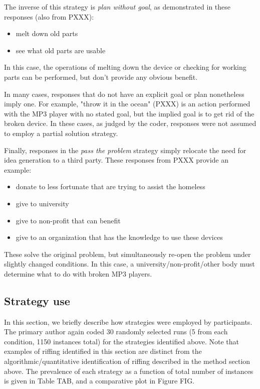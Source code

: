 The inverse of this strategy is \emph{plan without goal}, as demonstrated in these responses (also from PXXX):

\begin{itemize}
    \item melt down old parts
    \item see what old parts are usable
\end{itemize}

In this case, the operations of melting down the device or checking for working parts can be performed, but don't provide any obvious benefit.

In many cases, responses that do not have an explicit goal or plan nonetheless imply one. For example, "throw it in the ocean" (PXXX) is an action performed with the MP3 player with no stated goal, but the implied goal is to get rid of the broken device. In these cases, as judged by the coder, responses were not assumed to employ a partial solution strategy.

Finally, responses in the \emph{pass the problem} strategy simply relocate the need for idea generation to a third party. These responses from PXXX provide an example:

\begin{itemize}
    \item donate to less fortunate that are trying to assist the homeless
    \item give to university
    \item give to non-profit that can benefit
    \item give to an organization that has the knowledge to use these devices
\end{itemize}

These solve the original problem, but simultaneously re-open the problem under slightly changed conditions. In this case, a university/non-profit/other body must determine what to do with broken MP3 players.

\subsection{Strategy use}

In this section, we briefly describe how strategies were employed by participants. The primary author again coded 30 randomly selected runs (5 from each condition, 1150 instances total) for the strategies identified above. Note that examples of riffing identified in this section are distinct from the algorithmic/quantitative identification of riffing described in the method section above. The prevalence of each strategy as a function of total number of instances is given in Table TAB, and a comparative plot in Figure FIG.

